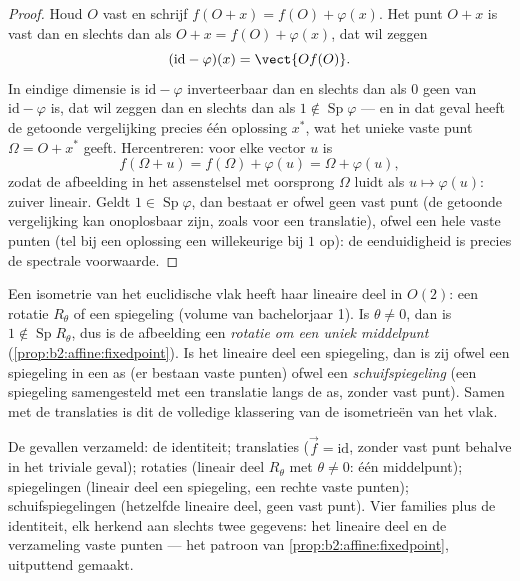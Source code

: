 \begin{proof}
Houd $O$ vast en schrijf $f(O + x) = f(O) + \varphi(x)$. Het punt
$O + x$ is vast dan en slechts dan als $O + x = f(O) + \varphi(x)$,
dat wil zeggen
\[
(\mathrm{id} - \varphi)(x) = \vect{O f(O)} .
\]
In eindige dimensie is $\mathrm{id} - \varphi$ inverteerbaar dan en
slechts dan als $0$ geen  van $\mathrm{id} - \varphi$
is, dat wil zeggen dan en slechts dan als $1 \notin
\operatorname{Sp}\varphi$ --- en in dat geval heeft de getoonde
vergelijking precies één oplossing $x^*$, wat het unieke vaste punt
$\Omega = O + x^*$ geeft. Hercentreren: voor elke vector $u$ is
\[
f(\Omega + u) = f(\Omega) + \varphi(u) = \Omega + \varphi(u),
\]
zodat de afbeelding in het assenstelsel met oorsprong $\Omega$
luidt als $u \mapsto \varphi(u)$: zuiver lineair. Geldt $1 \in
\operatorname{Sp}\varphi$, dan bestaat er ofwel geen vast punt (de
getoonde vergelijking kan onoplosbaar zijn, zoals voor een
translatie), ofwel een hele  vaste punten (tel
bij een oplossing een willekeurige  bij  $1$
op): de eenduidigheid is precies de spectrale voorwaarde.
\end{proof}

\begin{example}\label{ex:b2:affine:isometries}
Een  isometrie van het euclidische vlak heeft haar lineaire
deel in $O(2)$: een rotatie $R_\theta$ of een spiegeling (volume
van bachelorjaar 1). Is $\theta \neq 0$, dan is $1 \notin
\operatorname{Sp} R_\theta$, dus is de afbeelding een
\emph{rotatie om een uniek middelpunt}
(\cref{prop:b2:affine:fixedpoint}). Is het lineaire deel een
spiegeling, dan is zij ofwel een spiegeling in een as (er bestaan
vaste punten) ofwel een \emph{schuifspiegeling} (een spiegeling
samengesteld met een translatie langs de as, zonder vast punt).
Samen met de translaties is dit de volledige klassering van de
isometrieën van het vlak.
\end{example}

\begin{remark}
De gevallen verzameld: de identiteit; translaties ($\vec f =
\mathrm{id}$, zonder vast punt behalve in het triviale geval);
rotaties (lineair deel $R_\theta$ met $\theta \neq 0$: één
middelpunt); spiegelingen (lineair deel een spiegeling, een rechte
vaste punten); schuifspiegelingen (hetzelfde lineaire deel, geen
vast punt). Vier families plus de identiteit, elk herkend aan
slechts twee gegevens: het lineaire deel en de verzameling vaste
punten --- het patroon van \cref{prop:b2:affine:fixedpoint},
uitputtend gemaakt.
\end{remark}

